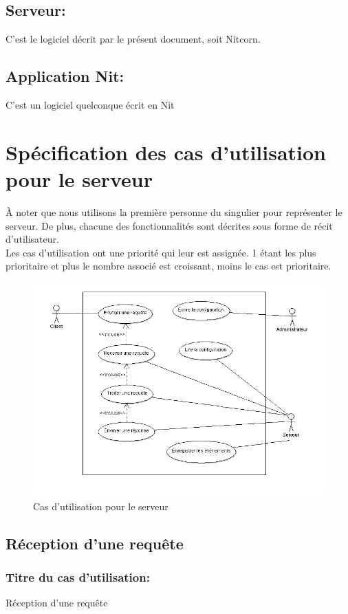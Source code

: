 \documentclass{scrreprt}
\begin{document}
\subsection{Serveur:} C'est le logiciel décrit par le présent document, soit Nitcorn.
\subsection{Application Nit:} C'est un logiciel quelconque écrit en Nit

\section{Spécification des cas d'utilisation pour le serveur} 
À noter que nous utilisons la première personne du singulier pour représenter le serveur. De plus, chacune des fonctionnalités sont décrites sous forme de récit d'utilisateur.\\
Les cas d'utilisation ont une priorité qui leur est assignée. 1 étant les plus prioritaire et plus le nombre associé est croissant, moins le cas est prioritaire.

\begin{figure}
	\caption{Cas d'utilisation pour le serveur}
	\includegraphics[width=\textwidth]{./diagram/section32.png}
\end{figure}
\subsection{Réception d'une requête}
\subsubsection{Titre du cas d'utilisation:} Réception d'une requête
\end{document}
